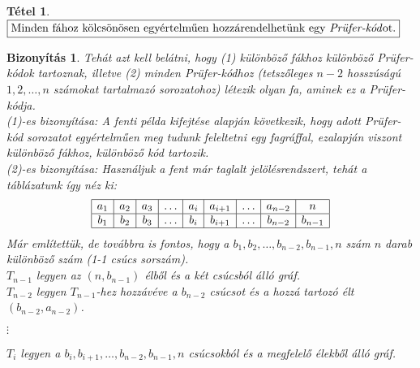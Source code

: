 \documentclass[a4paper,12pt,twoside]{book}
\newtheorem{tetel}{Tétel}[chapter]
\newtheorem{biz}{Bizonyítás}[chapter]
\theoremstyle{break}
\begin{document}
\begin{tetel}
 $\boxed{$Minden fához kölcsönösen egyértelműen hozzárendelhetünk egy \textit{Prüfer-kód}ot.$}$
\end{tetel}
\begin{biz}
 Tehát azt kell belátni, hogy (1) különböző fákhoz különböző Prüfer-kódok tartoznak, illetve (2) minden Prüfer-kódhoz (tetszőleges $n-2$ hosszúságú $1,2,\ldots,n$ számokat tartalmazó sorozatohoz) létezik olyan fa, aminek ez a Prüfer-kódja.\\
 \textit{(1)-es bizonyítása}: A fenti példa kifejtése alapján következik, hogy adott Prüfer-kód sorozatot egyértelműen meg tudunk feleltetni egy fagráffal, ezalapján viszont különböző fákhoz, különböző kód tartozik.\\
 \textit{(2)-es bizonyítása}: Használjuk a fent már taglalt jelölésrendszert, tehát a táblázatunk így néz ki:
\[
\begin{array}{|c|c|c|c|c|c|c|c|c|}\hline
a_1 & a_2 & a_3 & \ldots & a_i & a_{i+1} & \ldots & a_{n-2} & n \\\hline
b_1 & b_2 & b_3 & \ldots & b_i & b_{i+1} & \ldots & b_{n-2} & b_{n-1} \\\hline
\end{array}
\]
Már említettük, de továbbra is fontos, hogy a $b_1, b_2, \ldots, b_{n-2}, b_{n-1}, n$ szám $n$ darab különböző szám (1-1 csúcs sorszám).\\

$T_{n-1}$ legyen az $(n, b_{n-1})$ élből és a két csúcsból álló gráf.\\
$T_{n-2}$ legyen $T_{n-1}$-hez hozzávéve a $b_{n-2}$ csúcsot és a hozzá tartozó élt $(b_{n-2}, a_{n-2})$.
\begin{center}$\vdots$\end{center}
$T_i$ legyen a $b_i, b_{i+1}, \ldots, b_{n-2}, b_{n-1}, n$ csúcsokból és a megfelelő élekből álló gráf.\\


\end{biz}
\end{document}
